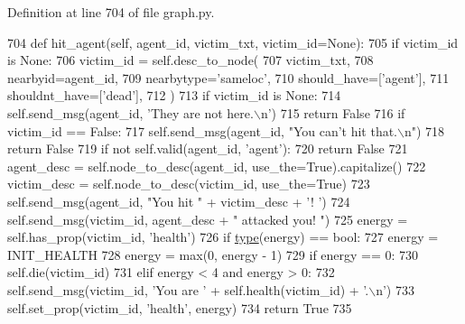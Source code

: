 Definition at line 704 of file graph.\+py.


\begin{DoxyCode}
704     \textcolor{keyword}{def }hit\_agent(self, agent\_id, victim\_txt, victim\_id=None):
705         \textcolor{keywordflow}{if} victim\_id \textcolor{keywordflow}{is} \textcolor{keywordtype}{None}:
706             victim\_id = self.desc\_to\_node(
707                 victim\_txt,
708                 nearbyid=agent\_id,
709                 nearbytype=\textcolor{stringliteral}{'sameloc'},
710                 should\_have=[\textcolor{stringliteral}{'agent'}],
711                 shouldnt\_have=[\textcolor{stringliteral}{'dead'}],
712             )
713             \textcolor{keywordflow}{if} victim\_id \textcolor{keywordflow}{is} \textcolor{keywordtype}{None}:
714                 self.send\_msg(agent\_id, \textcolor{stringliteral}{'They are not here.\(\backslash\)n'})
715                 \textcolor{keywordflow}{return} \textcolor{keyword}{False}
716             \textcolor{keywordflow}{if} victim\_id == \textcolor{keyword}{False}:
717                 self.send\_msg(agent\_id, \textcolor{stringliteral}{"You can't hit that.\(\backslash\)n"})
718                 \textcolor{keywordflow}{return} \textcolor{keyword}{False}
719         \textcolor{keywordflow}{if} \textcolor{keywordflow}{not} self.valid(agent\_id, \textcolor{stringliteral}{'agent'}):
720             \textcolor{keywordflow}{return} \textcolor{keyword}{False}
721         agent\_desc = self.node\_to\_desc(agent\_id, use\_the=\textcolor{keyword}{True}).capitalize()
722         victim\_desc = self.node\_to\_desc(victim\_id, use\_the=\textcolor{keyword}{True})
723         self.send\_msg(agent\_id, \textcolor{stringliteral}{"You hit "} + victim\_desc + \textcolor{stringliteral}{'! '})
724         self.send\_msg(victim\_id, agent\_desc + \textcolor{stringliteral}{" attacked you! "})
725         energy = self.has\_prop(victim\_id, \textcolor{stringliteral}{'health'})
726         \textcolor{keywordflow}{if} \hyperlink{namespaceparlai_1_1agents_1_1tfidf__retriever_1_1build__tfidf_ad5dfae268e23f506da084a9efb72f619}{type}(energy) == bool:
727             energy = INIT\_HEALTH
728         energy = max(0, energy - 1)
729         \textcolor{keywordflow}{if} energy == 0:
730             self.die(victim\_id)
731         \textcolor{keywordflow}{elif} energy < 4 \textcolor{keywordflow}{and} energy > 0:
732             self.send\_msg(victim\_id, \textcolor{stringliteral}{'You are '} + self.health(victim\_id) + \textcolor{stringliteral}{'.\(\backslash\)n'})
733         self.set\_prop(victim\_id, \textcolor{stringliteral}{'health'}, energy)
734         \textcolor{keywordflow}{return} \textcolor{keyword}{True}
735 
\end{DoxyCode}
